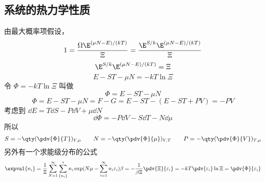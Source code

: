 \subsection{系统的热力学性质}
由最大概率项假设，
\begin{equation}
1 = \frac{\Omega \E^{(\mu N - E)/(kT)}}{\Xi}
= \frac{\E^{S/k} \E^{(\mu N - E)/(kT)}}{\Xi}
\end{equation}
\begin{equation}
\E^{S/k} \E^{(\mu N - E)/(kT)} = \Xi
\end{equation}
\begin{equation} 
E - ST - \mu N =  - kT\ln \Xi
\end{equation}
令 $\Phi  =  - kT\ln \Xi $ 叫做
\begin{equation}
\Phi  = E - ST - \mu N
\end{equation}
\begin{equation}
\Phi  = E - ST - \mu N = F - G = E - ST - (E - ST + PV) =  - PV
\end{equation}
考虑到 $\dd{E} = T\dd{S} - P\dd{V} + \mu \dd{N}$
\begin{equation}
\dd{\Phi} = -P\dd{V} - S\dd{T} - N\dd{\mu}
\end{equation}
所以
\begin{equation}
S = -\qty(\pdv{\Phi}{T})_{V,\mu } \qquad 
N = - \qty(\pdv{\Phi}{\mu})_{V,T} \qquad
P = - \qty(\pdv{\Phi}{V})_{T,\mu}
\end{equation}
另外有一个求能级分布的公式
\begin{equation}
\expval{n_i} = \frac{1}{\Xi} \sum_{N=1}^\infty \sum_{\{n_i\}}^* n_i \exp(N\mu - \sum_{i=1}^\infty n_i \varepsilon_i)\beta = -\frac{1}{\beta \Xi } \pdv{\Xi}{\varepsilon_i} =  - kT \pdv{\varepsilon_i} \ln \Xi  = \pdv{\Phi}{\varepsilon_i}
\end{equation}
